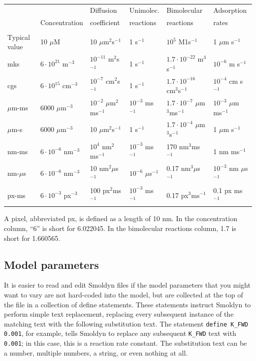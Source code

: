 \documentclass {scrbook}
\newcommand {\ttt} {\texttt}
\begin{document}
\begin{longtable}[c]{llllll}
&& Diffusion & Unimolec. & Bimolecular & Adsorption\\
& Concentration & coefficient & reactions & reactions & rates\\
\hline \\
Typical value & 10 $\mu$M & 10 $\mu$m$^2$s$^{-1}$ & 1 s$^{-1}$ & $10^5$ M1s$^{-1}$ & 1 $\mu$m s$^{-1}$\\
mks & $6\cdot10^{21}$ m$^{-3}$ & $10^{-11}$ m$^2$s$^{-1}$ & 1 s$^{-1}$ & $1.7\cdot10^{-22}$ m$^3$s$^{-1}$ & $10^{-6}$ m s$^{-1}$\\
cgs & $6\cdot10^{15}$ cm$^{-3}$ & $10^{-7}$ cm$^2$s$^{-1}$ & 1 s$^{-1}$ & $1.7\cdot10^{-16}$ cm$^3$s$^{-1}$ & $10^{-4}$ cm s$^{-1}$\\
$\mu$m-ms & 6000 $\mu$m$^{-3}$ & $10^{-2}$ $\mu$m$^2$ms$^{-1}$ & $10^{-3}$ ms$^{-1}$ & $1.7\cdot10^{-7}$ $\mu$m$^3$ms$^{-1}$ & $10^{-3}$ $\mu$m ms$^{-1}$\\
$\mu$m-s & 6000 $\mu$m$^{-3}$ & 10 $\mu$m$^2$s$^{-1}$ & 1 s$^{-1}$ & $1.7\cdot10^{-4}$ $\mu$m$^3$s$^{-1}$ & 1 $\mu$m s$^{-1}$\\
nm-ms & $6\cdot10^{-6}$ nm$^{-3}$ & $10^4$ nm$^2$ms$^{-1}$ & $10^{-3}$ ms$^{-1}$ & 170 nm$^3$ms$^{-1}$ & 1 nm ms$^{-1}$\\
nm-$\mu$s & $6\cdot10^{-6}$ nm$^{-3}$ & 10 nm$^2$$\mu$s$^{-1}$ & $10^{-6}$ $\mu$s$^{-1}$ & 0.17 nm$^3$$\mu$s$^{-1}$ & $10^{-3}$ nm $\mu$s$^{-1}$\\
px-ms & $6\cdot10^{-3}$ px$^{-3}$ & 100 px$^2$ms$^{-1}$ & $10^{-3}$ ms$^{-1}$ & 0.17 px$^3$ms$^{-1}$ & 0.1 px ms$^{-1}$\\
\end{longtable}

A pixel, abbreviated px, is defined as a length of 10 nm. In the concentration column, ``6'' is short for 6.022045. In the bimolecular reactions column, 1.7 is short for 1.660565.

\subsection*{Model parameters}

It is easier to read and edit Smoldyn files if the model parameters that you might want to vary are not hard-coded into the model, but are collected at the top of the file in a collection of define statements. These statements instruct Smoldyn to perform simple text replacement, replacing every subsequent instance of the matching text with the following substitution text. The statement  \ttt{define K\_FWD 0.001}, for example, tells Smoldyn to replace any subsequent  \ttt{K\_FWD} text with  \ttt{0.001}; in this case, this is a reaction rate constant. The substitution text can be a number, multiple numbers, a string, or even nothing at all.
\end{document}
